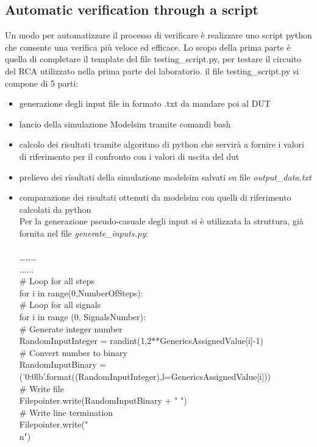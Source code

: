 \subsection{Automatic verification through a script}
Un modo per automatizzare il processo di verificare è realizzare uno script python che consente una verifica più veloce ed efficace. Lo scopo della prima parte è quella di completare il template del file testing\_script.py, per testare il circuito del RCA utilizzato nella prima parte del laboratorio.
il file testing\_script.py  si compone di 5 parti:
\begin{itemize}
	\item{generazione degli input file in formato .txt da mandare poi al DUT}
	\item{lancio della simulazione Modelsim tramite comandi bash}
	\item{calcolo dei risultati tramite algoritmo di python che servirà a fornire i valori di riferimento per il confronto con i valori  di uscita del dut}
	\item{prelievo dei risultati della simulazione modelsim salvati su file \textit{output\_data.txt}}
	\item{comparazione dei risultati ottenuti da modelsim con quelli di riferimento calcolati da python}
\\
Per la generazione pseudo-casuale degli input si è utilizzata la struttura, già fornita nel file \textit{generate\_inputs.py}:\\
\\
………\\
......\\
\# Loop for all steps\\
for i in range(0,NumberOfSteps):\\
\# Loop for all signals\\
for i in range (0, SignalsNumber):\\
\# Generate integer number\\
RandomInputInteger = randint(1,2**GenericsAssignedValue[i]-1)\\
\# Convert number to binary\\
RandomInputBinary = ('{0:0{l}b}'.format((RandomInputInteger),l=GenericsAssignedValue[i]))\\
\# Write file\\
Filepointer.write(RandomInputBinary + " ")\\
\# Write line termination\\
Filepointer.write("\\n")\\

\end{itemize}
